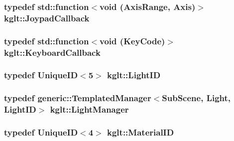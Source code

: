 \hypertarget{namespacekglt_aa8de4aa3c6cd3469d4032a4a04761eb6}{
\subsubsection[{Joypad\-Callback}]{\setlength{\rightskip}{0pt plus 5cm}typedef std\-::function$<$void ({\bf Axis\-Range}, {\bf Axis})$>$ {\bf kglt\-::\-Joypad\-Callback}}}\label{namespacekglt_aa8de4aa3c6cd3469d4032a4a04761eb6}
\hypertarget{namespacekglt_ae7d41ce25070124da5ac2997c7a3ebe7}{
\subsubsection[{Keyboard\-Callback}]{\setlength{\rightskip}{0pt plus 5cm}typedef std\-::function$<$void ({\bf Key\-Code})$>$ {\bf kglt\-::\-Keyboard\-Callback}}}\label{namespacekglt_ae7d41ce25070124da5ac2997c7a3ebe7}
\hypertarget{namespacekglt_ab90464803ef8e3c1f6da41388e859968}{
\subsubsection[{Light\-I\-D}]{\setlength{\rightskip}{0pt plus 5cm}typedef {\bf Unique\-I\-D}$<$5$>$ {\bf kglt\-::\-Light\-I\-D}}}\label{namespacekglt_ab90464803ef8e3c1f6da41388e859968}
\hypertarget{namespacekglt_a67c1f31982b8d0c54506d309b20780e2}{
\subsubsection[{Light\-Manager}]{\setlength{\rightskip}{0pt plus 5cm}typedef {\bf generic\-::\-Templated\-Manager}$<${\bf Sub\-Scene}, {\bf Light}, {\bf Light\-I\-D}$>$ {\bf kglt\-::\-Light\-Manager}}}\label{namespacekglt_a67c1f31982b8d0c54506d309b20780e2}
\hypertarget{namespacekglt_a5ffac6377a7d3e163b4d5c31f71db43a}{
\subsubsection[{Material\-I\-D}]{\setlength{\rightskip}{0pt plus 5cm}typedef {\bf Unique\-I\-D}$<$4$>$ {\bf kglt\-::\-Material\-I\-D}}}\label{namespacekglt_a5ffac6377a7d3e163b4d5c31f71db43a}
